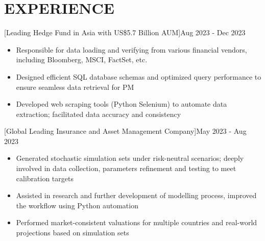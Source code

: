 \documentclass[cmu]{resume}
\begin{document}
    \section{EXPERIENCE}
    [Leading Hedge Fund in Asia with US\$5.7 Billion AUM]{Aug 2023 - Dec 2023}
    \begin{itemize}
        \item Responsible for data loading and verifying from various financial vendors, including Bloomberg, MSCI, FactSet, etc.
        \item Designed efficient SQL database schemas and optimized query performance to ensure seamless data retrieval for PM
        \item Developed web scraping tools (Python Selenium) to automate data extraction; facilitated data accuracy and consistency
    \end{itemize}

    [Global Leading Insurance and Asset Management Company]{May 2023 - Aug 2023}
    \begin{itemize}
        \item Generated stochastic simulation sets under risk-neutral scenarios; deeply involved in data collection, parameters refinement and testing to meet calibration targets
        \item Assisted in research and further development of modelling process, improved the workflow using Python automation
        \item Performed market-consistent valuations for multiple countries and real-world projections based on simulation sets
    \end{itemize}
\end{document}
